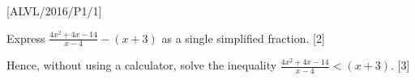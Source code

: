 \item {[}ALVL/2016/P1/1{]}

Express $\frac{4x^{2}+4x-14}{x-4}-\left(x+3\right)$ as a single simplified
fraction. \hfill{}{[}2{]}

Hence, without using a calculator, solve the inequality $\frac{4x^{2}+4x-14}{x-4}<\left(x+3\right)$.
\hfill{}{[}3{]}
